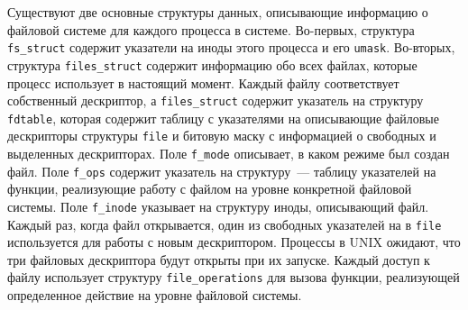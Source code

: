 Существуют две основные структуры данных, описывающие информацию о файловой
системе для каждого процесса в системе. Во-первых, структура \texttt{fs\_struct}
содержит указатели на иноды этого процесса и его \texttt{umask}. Во-вторых,
структура \texttt{files\_struct} содержит информацию обо всех файлах, которые
процесс использует в настоящий момент. Каждый файлу соответствует собственный
дескриптор, а \texttt{files\_struct} содержит указатель на структуру
\texttt{fdtable}, которая содержит таблицу с указателями на описывающие файловые
дескрипторы структуры \texttt{file} и битовую маску с информацией о свободных и
выделенных дескрипторах. Поле \texttt{f\_mode} описывает, в каком режиме был
создан файл. Поле \texttt{f\_ops} содержит указатель на структуру~--- таблицу
указателей на функции, реализующие работу с файлом на уровне конкретной файловой
системы. Поле \texttt{f\_inode} указывает на структуру иноды, описывающий файл.
Каждый раз, когда файл открывается, один из свободных указателей на в
\texttt{file} используется для работы с новым дескриптором. Процессы в UNIX
ожидают, что три файловых дескриптора будут открыты при их запуске. Каждый
доступ к файлу использует структуру \texttt{file\_operations} для вызова
функции, реализующей определенное действие на уровне файловой системы.
